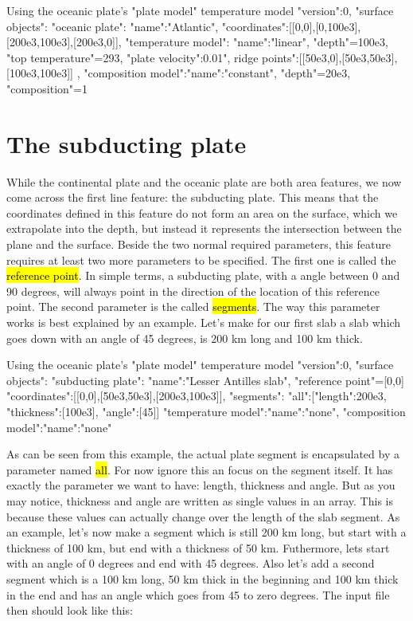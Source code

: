\documentclass{book}
\begin{document}
\begin{bashcode}{Using the oceanic plate's "plate model" temperature model}
"version":0,
"surface objects":
{
  "oceanic plate":
  {
    "name":"Atlantic",
    "coordinates":[[0,0],[0,100e3],[200e3,100e3],[200e3,0]],
    "temperature model":
    {
      "name":"linear", "depth"=100e3, "top temperature"=293,
      "plate velocity":0.01", ridge points":[[50e3,0],[50e3,50e3],[100e3,100e3]]
    },
    "composition model":{"name":"constant", "depth"=20e3, "composition"=1}
  }
}
\end{bashcode}

\section{The subducting plate}
While the continental plate and the oceanic plate are both area features, we now come across the first line feature: the subducting plate. This means that the coordinates defined in this feature do not form an area on the surface, which we extrapolate into the depth, but instead it represents the intersection between the plane and the surface. Beside the two normal required parameters, this feature requires at least two more parameters to be specified. The first one is called the \hl{reference point}. In simple terms, a subducting plate, with a angle between 0 and 90 degrees, will always point in the direction of the location of this reference point. The second parameter is the called \hl{segments}. The way this parameter works is best explained by an example. Let's make for our first slab a slab which goes down with an angle of 45 degrees, is 200 km long and 100 km thick.

\begin{bashcode}{Using the oceanic plate's "plate model" temperature model}
"version":0,
"surface objects":
{
  "subducting plate":
  {
    "name":"Lesser Antilles slab", "reference point"=[0,0]
    "coordinates":[[0,0],[50e3,50e3],[200e3,100e3]],
    "segments":
    {
      "all":[{"length":200e3, "thickness":[100e3], "angle":[45]}]
    }
    "temperature model":{"name":"none"},
    "composition model":{"name":"none"}
  }
}
\end{bashcode}

As can be seen from this example, the actual plate segment is encapsulated by a parameter named \hl{all}. For now ignore this an focus on the segment itself. It has exactly the parameter we want to have: length, thickness and angle. But as you may notice, thickness and angle are written as single values in an array. This is because these values can actually change over the length of the slab segment. As an example, let's now make a segment which is still 200 km long, but start with a thickness of 100 km, but end with a thickness of 50 km. Futhermore, lets start with an angle of 0 degrees and end with 45 degrees. Also let's add a second segment which is a 100 km long, 50 km thick in the beginning and 100 km thick in the end and has an angle which goes from 45 to zero degrees. The input file then should look like this:
\end{document}
